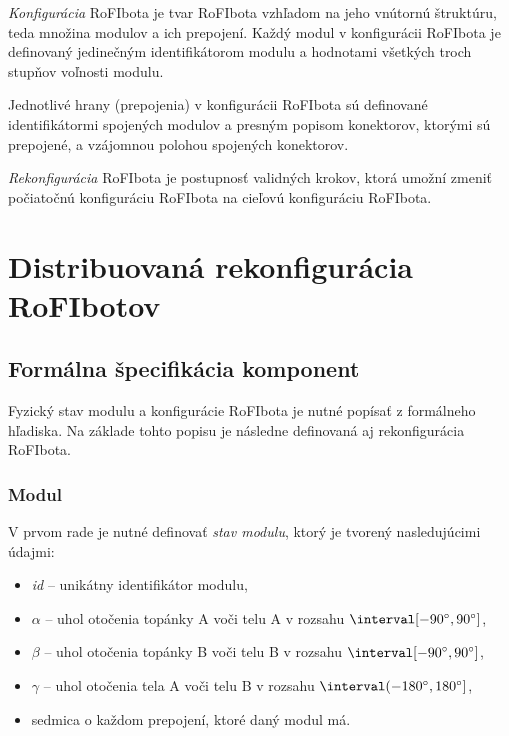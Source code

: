 \documentclass[
  digital, %
  oneside, %
  notable,   %
  lof,     %
  nolot,     %
]{fithesis3}
\begin{document}
\textit{Konfigurácia} RoFIbota je tvar RoFIbota vzhľadom na jeho vnútornú štruktúru, teda množina modulov a ich prepojení. Každý modul v konfigurácii RoFIbota je definovaný jedinečným identifikátorom modulu a hodnotami všetkých troch stupňov voľnosti modulu. 

Jednotlivé hrany (prepojenia) v konfigurácii RoFIbota sú definované identifikátormi spojených modulov a presným popisom konektorov, ktorými sú prepojené, a vzájomnou polohou spojených konektorov. 

\textit{Rekonfigurácia} RoFIbota je postupnosť validných krokov, ktorá u\-mož\-ní zmeniť počiatočnú konfiguráciu RoFIbota na cieľovú konfiguráciu RoFIbota. 






\chapter{Distribuovaná rekonfigurácia RoFIbotov}
\section{Formálna špecifikácia komponent}
\label{sec:formalSpec}
Fyzický stav modulu a konfigurácie RoFIbota je nutné popísať z formálneho hľadiska. Na základe tohto popisu je následne definovaná aj rekonfigurácia RoFIbota. 

\subsection{Modul}
\label{sec:formalSpecModul}
V prvom rade je nutné definovať \textit{stav modulu}, ktorý je tvorený nasledujúcimi údajmi: 
\begin{itemize}
    \item \textit{id} -- unikátny identifikátor modulu, 
    \item $\alpha$ -- uhol otočenia topánky A voči telu A v rozsahu $\interval[{-90\degree, 90\degree}]$,
    \item $\beta$ -- uhol otočenia topánky B voči telu B v rozsahu $\interval[{-90\degree, 90\degree}]$,
    \item $\gamma$ -- uhol otočenia tela A voči telu B v rozsahu $\interval({-180\degree, 180\degree}]$,
    \item sedmica o každom prepojení, ktoré daný modul má. 
\end{itemize} 
\end{document}
